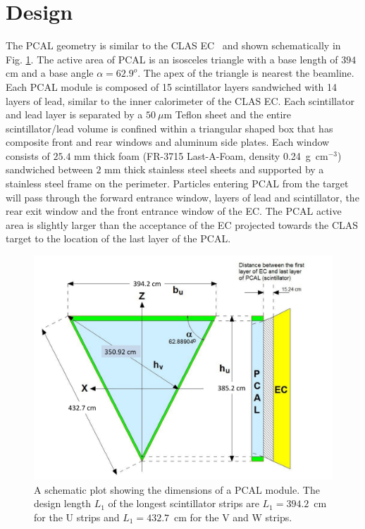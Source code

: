 \section{Design}

The PCAL geometry is similar to the CLAS EC~\cite{clas6nim} and shown schematically in Fig. \ref{fig:S3_1}.   The active area of PCAL is an isosceles triangle with a base length of $394$ cm and a base angle $\alpha=62.9^o$. The apex of the triangle is nearest the beamline. Each PCAL module is composed of 15 scintillator layers sandwiched with 14 layers of lead, similar to the inner calorimeter of the CLAS EC.  Each scintillator and lead layer is separated by a $50~\mu$m Teflon sheet and the entire scintillator/lead volume is confined within a triangular shaped box that has composite front and rear windows and aluminum side plates. Each window consists of $25.4$ mm thick foam (FR-3715 Last-A-Foam, density 0.24~g~cm$^{-3}$) sandwiched between $2$ mm thick stainless steel sheets and supported by a stainless steel frame on the perimeter.  Particles entering PCAL from the target will pass through the forward entrance window, layers of lead and scintillator, the rear exit window and the front entrance window of the EC.  The PCAL active area is slightly larger than the acceptance of the EC projected towards the CLAS target to the location of the last layer of the PCAL. 

\begin{figure}[hbt]
\centering
\includegraphics[width=1.0\columnwidth,keepaspectratio]{img/S3_1.pdf}
\caption[A schematic plot of PCAL]{A schematic plot showing the dimensions of a PCAL module. The design length $L_1$ of the longest scintillator strips are $L_1=394.2$~cm for the U strips and $L_1=432.7$~cm for the V and W strips. }
\label{fig:S3_1}
\end{figure}

